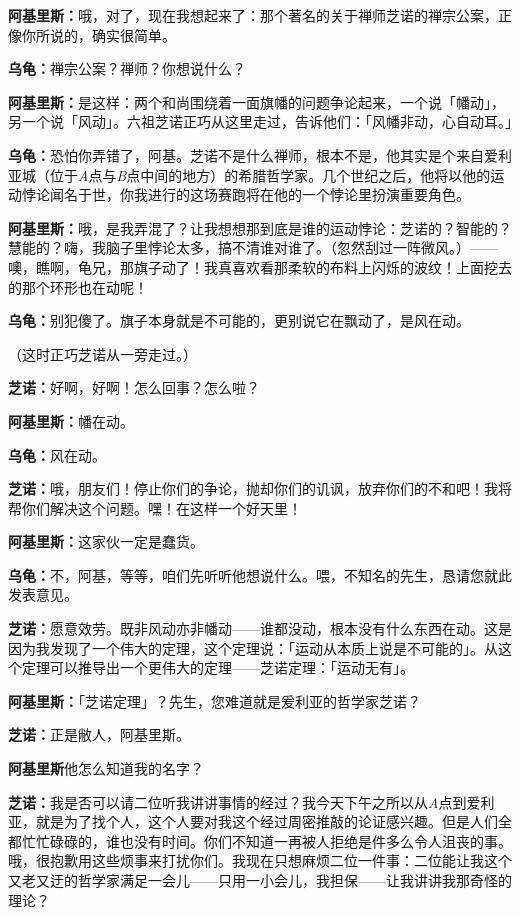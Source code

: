 \documentclass[
  12pt,
  twoside,
  openright,
  oldfontcommands,
]{memoir}
\newcommand{\kaitismall}[1]{{\kaitifamily\small #1}}
\newcommand{\dialogname}[1]{{\heifamily\bfseries #1}}
\begin{document}
\dialogname{阿基里斯：}哦，对了，现在我想起来了：那个著名的关于禅师芝诺的禅宗公案，正像你所说的，确实很简单。

\dialogname{乌龟：}禅宗公案？禅师？你想说什么？

\dialogname{阿基里斯：}是这样：两个和尚围绕着一面旗幡的问题争论起来，一个说「幡动」，另一个说「风动」。六祖芝诺正巧从这里走过，告诉他们：「风幡非动，心自动耳。」

\dialogname{乌龟：}恐怕你弄错了，阿基。芝诺不是什么禅师，根本不是，他其实是个来自爱利亚城（位于\emph{A}点与\emph{B}点中间的地方）的希腊哲学家。几个世纪之后，他将以他的运动悖论闻名于世，你我进行的这场赛跑将在他的一个悖论里扮演重要角色。

\dialogname{阿基里斯：}哦，是我弄混了？让我想想那到底是谁的运动悖论：芝诺的？智能的？慧能的？嗨，我脑子里悖论太多，搞不清谁对谁了。\kaitismall{（忽然刮过一阵微风。）}------噢，瞧啊，龟兄，那旗子动了！我真喜欢看那柔软的布料上闪烁的波纹！上面挖去的那个环形也在动呢！

\dialogname{乌龟：}别犯傻了。旗子本身就是不可能的，更别说它在飘动了，是风在动。

（这时正巧芝诺从一旁走过。）

\dialogname{芝诺：}好啊，好啊！怎么回事？怎么啦？

\dialogname{阿基里斯：}幡在动。

\dialogname{乌龟：}风在动。

\dialogname{芝诺：}哦，朋友们！停止你们的争论，抛却你们的讥讽，放弃你们的不和吧！我将帮你们解决这个问题。嘿！在这样一个好天里！

\dialogname{阿基里斯：}这家伙一定是蠢货。

\dialogname{乌龟：}不，阿基，等等，咱们先听听他想说什么。喂，不知名的先生，恳请您就此发表意见。

\dialogname{芝诺：}愿意效劳。既非风动亦非幡动------谁都没动，根本没有什么东西在动。这是因为我发现了一个伟大的定理，这个定理说：「运动从本质上说是不可能的」。从这个定理可以推导出一个更伟大的定理------芝诺定理：「运动无有」。

\dialogname{阿基里斯：}「芝诺定理」？先生，您难道就是爰利亚的哲学家芝诺？

\dialogname{芝诺：}正是敝人，阿基里斯。

\dialogname{阿基里斯}他怎么知道我的名字？

\dialogname{芝诺：}我是否可以请二位听我讲讲事情的经过？我今天下午之所以从\emph{A}点到爱利亚，就是为了找个人，这个人要对我这个经过周密推敲的论证感兴趣。但是人们全都忙忙碌碌的，谁也没有时间。你们不知道一再被人拒绝是件多么令人沮丧的事。哦，很抱歉用这些烦事来打扰你们。我现在只想麻烦二位一件事：二位能让我这个又老又迂的哲学家满足一会儿------只用一小会儿，我担保------让我讲讲我那奇怪的理论？
\end{document}
